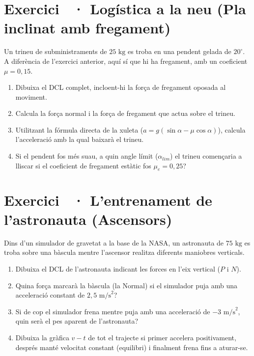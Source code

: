 \documentclass[12pt,a4paper,twoside]{article}
\newcounter{exercici}
\newcommand{\exercici}[1]{%
  \stepcounter{exercici}
  \section*{Exercici \theexercici\ \textnormal{· #1}}
  \vspace{-10pt}
}
\begin{document}
\vspace{0.5cm}
\exercici{Logística a la neu (Pla inclinat amb fregament)}
Un trineu de subministraments de $25 \text{ kg}$ es troba en una pendent gelada de $20^\circ$. A diferència de l'exercici anterior, aquí sí que hi ha fregament, amb un coeficient $\mu = 0{,}15$.
\begin{enumerate}[label=\textbf{\alph*)}]
  \item Dibuixa el DCL complet, incloent-hi la força de fregament oposada al moviment.
  \item Calcula la força normal i la força de fregament que actua sobre el trineu.
  \item Utilitzant la fórmula directa de la xuleta ($a = g(\sin \alpha - \mu \cos \alpha)$), calcula l'acceleració amb la qual baixarà el trineu.
  \item Si el pendent fos més suau, a quin angle límit ($\alpha_{lim}$) el trineu començaria a lliscar si el coeficient de fregament estàtic fos $\mu_e = 0{,}25$?
\end{enumerate}

\clearpage
\exercici{L'entrenament de l'astronauta (Ascensors)}
Dins d'un simulador de gravetat a la base de la NASA, un astronauta de $75 \text{ kg}$ es troba sobre una bàscula mentre l'ascensor realitza diferents maniobres verticals.
\begin{enumerate}[label=\textbf{\alph*)}]
  \item Dibuixa el DCL de l'astronauta indicant les forces en l'eix vertical ($P$ i $N$).
  \item Quina força marcarà la bàscula (la Normal) si el simulador puja amb una acceleració constant de $2{,}5 \text{ m/s}^2$?
  \item Si de cop el simulador frena mentre puja amb una acceleració de $-3 \text{ m/s}^2$, quin serà el pes aparent de l'astronauta?
  \item Dibuixa la gràfica $v-t$ de tot el trajecte si primer accelera positivament, després manté velocitat constant (equilibri) i finalment frena fins a aturar-se.
\end{enumerate}
\end{document}
